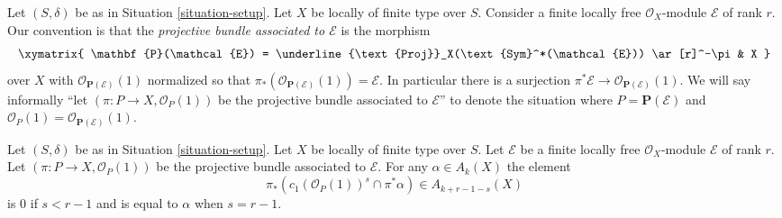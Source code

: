 \noindent
Let $(S, \delta)$ be as in Situation \ref{situation-setup}.
Let $X$ be locally of finite type over $S$.
Consider a finite locally free $\mathcal{O}_X$-module
$\mathcal{E}$ of rank $r$.
Our convention is that the {\it projective bundle associated to
$\mathcal{E}$} is the morphism
$$
\xymatrix{
\mathbf{P}(\mathcal{E}) =
\underline{\text{Proj}}_X(\text{Sym}^*(\mathcal{E}))
\ar[r]^-\pi
& X
}
$$
over $X$ with
$\mathcal{O}_{\mathbf{P}(\mathcal{E})}(1)$ normalized so that
$\pi_*(\mathcal{O}_{\mathbf{P}(\mathcal{E})}(1)) = \mathcal{E}$.
In particular there is a surjection
$\pi^*\mathcal{E} \to \mathcal{O}_{\mathbf{P}(\mathcal{E})}(1)$.
We will say informally ``let $(\pi : P \to X, \mathcal{O}_P(1))$
be the projective bundle associated to $\mathcal{E}$'' to denote
the situation where $P = \mathbf{P}(\mathcal{E})$ and
$\mathcal{O}_P(1) = \mathcal{O}_{\mathbf{P}(\mathcal{E})}(1)$.

\begin{lemma}
\label{lemma-cap-projective-bundle}
Let $(S, \delta)$ be as in Situation \ref{situation-setup}.
Let $X$ be locally of finite type over $S$.
Let $\mathcal{E}$ be a finite locally free $\mathcal{O}_X$-module
$\mathcal{E}$ of rank $r$. Let $(\pi : P \to X, \mathcal{O}_P(1))$
be the projective bundle associated to $\mathcal{E}$.
For any $\alpha \in A_k(X)$ the element
$$
\pi_*\left(
c_1(\mathcal{O}_P(1))^s \cap \pi^*\alpha
\right)
\in
A_{k + r - 1 - s}(X)
$$
is $0$ if $s < r - 1$ and is equal to $\alpha$ when $s = r - 1$.
\end{lemma}

